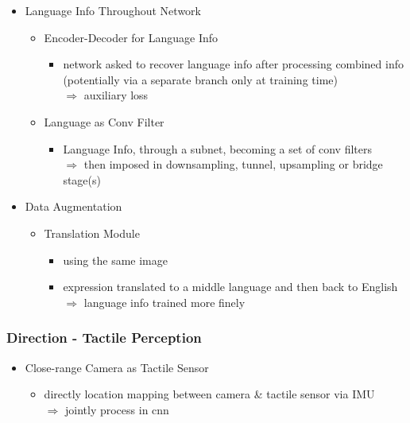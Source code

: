 \begin{itemize}
\begin{itemize}
\begin{itemize}
		\end{itemize}
	\end{itemize}
\item Language Info Throughout Network
	\begin{itemize}
	\item Encoder-Decoder for Language Info
		\begin{itemize}
		\item network asked to recover language info after processing combined info \\ 
		(potentially via a separate branch only at training time) \\ 
		$\Rightarrow$ auxiliary loss
		\end{itemize}
	\item Language as Conv Filter
		\begin{itemize}
		\item Language Info, through a subnet, becoming a set of conv filters \\
		$\Rightarrow$ then imposed in downsampling, tunnel, upsampling or bridge stage(s)
		\end{itemize}
	\end{itemize}
\item Data Augmentation
	\begin{itemize}
	\item Translation Module
		\begin{itemize}
		\item using the same image
		\item expression translated to a middle language and then back to English \\
		$\Rightarrow$ language info trained more finely
		\end{itemize}
	\end{itemize}
\end{itemize}
\subsubsection{Direction - Tactile Perception}
\begin{itemize}
\item Close-range Camera as Tactile Sensor
	\begin{itemize}
	\item directly location mapping between camera \& tactile sensor via IMU \\
	$\Rightarrow$ jointly process in cnn
	\end{itemize}
\end{itemize}



